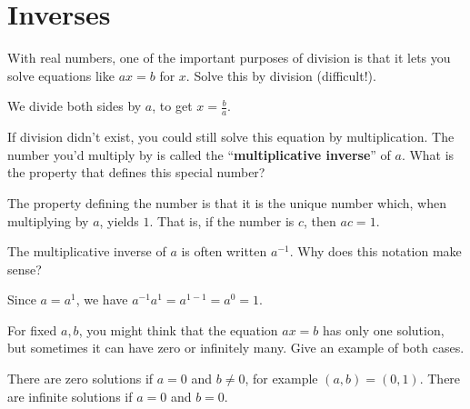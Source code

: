 \documentclass[../gatm_answers.tex]{subfiles}
\begin{document}
\section{Inverses}

\begin{outer_problem}[start=1]
\item
\end{outer_problem}

\begin{inner_problem}[start=1]
\item With real numbers, one of the important purposes of division is that it lets you solve equations like $ax=b$ for $x$. Solve this by division (difficult!).
\end{inner_problem}

We divide both sides by $a$, to get $x=\frac{b}{a}$.

\begin{inner_problem}
\item If division didn't exist, you could still solve this equation by multiplication. The number you'd multiply by is called the ``\textbf{multiplicative inverse}'' of $a$. What is the property that defines this special number?
\end{inner_problem}

The property defining the number is that it is the unique number which, when multiplying by $a$, yields $1$. That is, if the number is $c$, then $ac=1$.

\begin{inner_problem}
\item The multiplicative inverse of $a$ is often written $a^{-1}$. Why does this notation make sense?
\end{inner_problem}

Since $a=a^1$, we have $a^{-1}a^1=a^{1-1}=a^0=1$.

\begin{outer_problem}
\item
\end{outer_problem}

\begin{inner_problem}[start=1]
\item For fixed $a,b$, you might think that the equation $ax=b$ has only one solution, but sometimes it can have zero or infinitely many. Give an example of both cases.
\end{inner_problem}

There are zero solutions if $a=0$ and $b\neq 0$, for example $(a,b)=(0,1)$. There are infinite solutions if $a=0$ and $b=0$.
\end{document}
